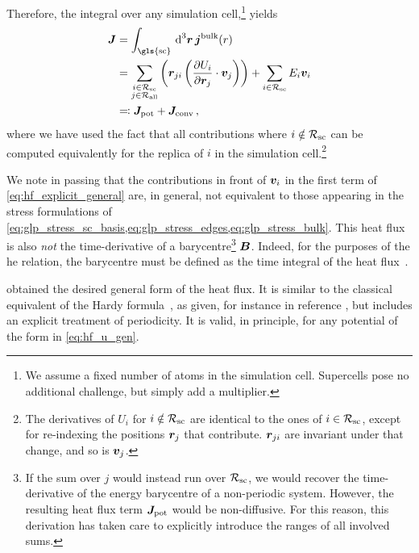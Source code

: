 Therefore, the integral over any simulation cell,\footnote{We assume a fixed number of atoms in the simulation cell. Supercells pose no additional challenge, but simply add a multiplier.} yields
\begin{align}
	\J &= \integral{\text{\gls{sc}}}^3 \R\,\densj^{\text{bulk}}(r) \\
	&= 
		\sum_{\substack{i \in \Rsc \\ j \in \Rall}} \left(\R_{ji} \left(\dur{i}{j}{} \cdot \V_j\right) \right) 
		+ \sum_{i \in \Rsc} E_i \V_i \label{eq:hf_explicit_general} \\
	&\defdas \Jpot + \Jconv \,,\label{eq:hf_general}
\end{align}
where we have used the fact that all contributions where $i \notin \mathcal{R_{\text{sc}}}$ can be computed equivalently for the replica of $i$ in the simulation cell.\footnote{The derivatives of $U_i$ for $i \notin \mathcal{R_{\text{sc}}}$ are identical to the ones of $i \in \mathcal{R_{\text{sc}}}$, except for re-indexing the positions $\boldsymbol{r}_j$ that contribute. $\boldsymbol{r}_{ji}$ are invariant under that change, and so is $\boldsymbol{v}_j$.}

We note in passing that the contributions in front of $\boldsymbol{v}_i$ in the first term of \cref{eq:hf_explicit_general} are, in general, not equivalent to those appearing in the stress formulations of \cref{eq:glp_stress_sc_basis,eq:glp_stress_edges,eq:glp_stress_bulk}.
This heat flux is also \emph{not} the time-derivative of a barycentre\footnote{If the sum over $j$ would instead run over $\mathcal{R_{\text{sc}}}$, we would recover the time-derivative of the energy barycentre of a non-periodic system. However, the resulting heat flux term $\boldsymbol{J}_\text{pot}$ would be non-diffusive. For this reason, this derivation has taken care to explicitly introduce the ranges of all involved sums.} $\boldsymbol{B}$. Indeed, for the purposes of the \gls{he} relation, the barycentre must be defined as the time integral of the heat flux~\cite{a1993t,e1995t}.

 obtained the desired general form of the heat flux. It is similar to the classical equivalent of the Hardy formula~\cite{h1963t}, as given, for instance in reference \cite[eq.~B3]{fpdh2015t}, but includes an explicit treatment of periodicity. It is valid, in principle, for any potential of the form in \cref{eq:hf_u_gen}.

